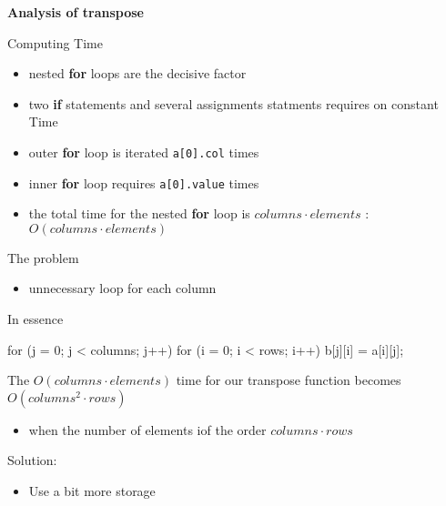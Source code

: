 \documentclass[newPxFont,sthlmFooter,nooffset]{beamer}
\begin{document}
\begin{frame}
\framebreak
\textbf{Analysis of transpose}

Computing Time
\begin{itemize}
  \item nested \textbf{for} loops are the decisive factor
  \item two \textbf{if} statements and several assignments statments requires on constant Time
  \item outer \textbf{for} loop is iterated \texttt{a[0].col} times
  \item inner \textbf{for} loop requires \texttt{a[0].value} times
  \item the total time for the nested \textbf{for} loop is $columns\cdot elements$ : $O(columns\cdot elements)$
\end{itemize}

The problem

\begin{itemize}
\item unnecessary loop for each column
\end{itemize}

\framebreak
In essence 
\begin{codedef}
for (j = 0; j < columns; j++)
    for (i = 0; i < rows; i++)
        b[j][i] = a[i][j];
\end{codedef}

The $O(columns \cdot elements)$ time for our transpose function becomes $O(columns^2 \cdot rows)$ 
\begin{itemize}
  \item when the number of elements iof the order $columns \cdot rows$
\end{itemize}

Solution: 
\begin{itemize}
  \item Use a bit more storage 
\end{itemize}
\end{frame}
\end{document}
